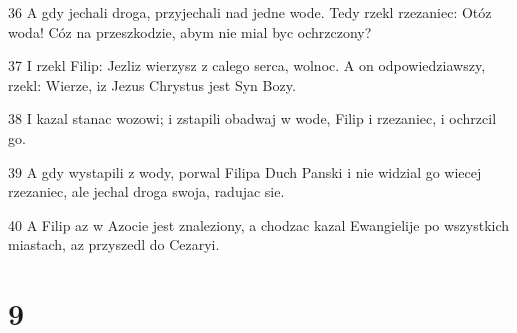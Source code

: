 \par 36 A gdy jechali droga, przyjechali nad jedne wode. Tedy rzekl rzezaniec: Otóz woda! Cóz na przeszkodzie, abym nie mial byc ochrzczony?
\par 37 I rzekl Filip: Jezliz wierzysz z calego serca, wolnoc. A on odpowiedziawszy, rzekl: Wierze, iz Jezus Chrystus jest Syn Bozy.
\par 38 I kazal stanac wozowi; i zstapili obadwaj w wode, Filip i rzezaniec, i ochrzcil go.
\par 39 A gdy wystapili z wody, porwal Filipa Duch Panski i nie widzial go wiecej rzezaniec, ale jechal droga swoja, radujac sie.
\par 40 A Filip az w Azocie jest znaleziony, a chodzac kazal Ewangielije po wszystkich miastach, az przyszedl do Cezaryi.

\chapter{9}

